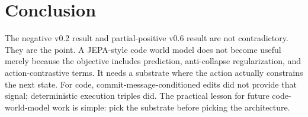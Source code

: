 \documentclass[11pt]{article}
\begin{document}
\section{Conclusion}

The negative v0.2 result and partial-positive v0.6 result are not contradictory.
They are the point. A JEPA-style code world model does not become useful merely
because the objective includes prediction, anti-collapse regularization, and
action-contrastive terms. It needs a substrate where the action actually
constrains the next state. For code, commit-message-conditioned edits did not
provide that signal; deterministic execution triples did. The practical lesson
for future code-world-model work is simple: pick the substrate before picking
the architecture.



\end{document}
